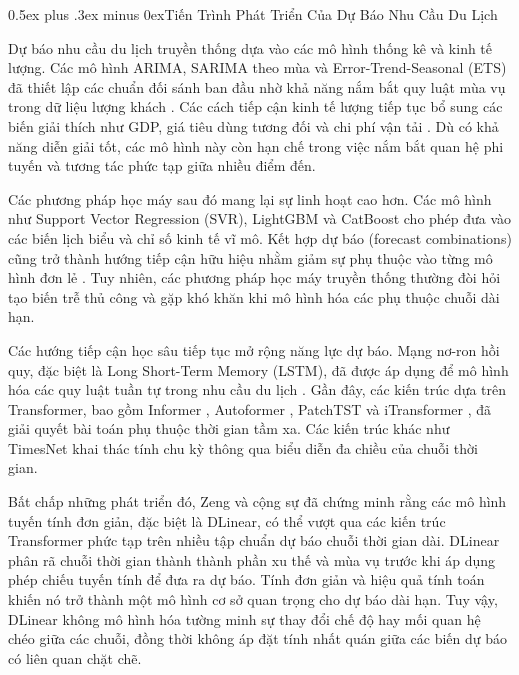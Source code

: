 \documentclass[10pt,journal,compsoc]{IEEEtran}
\makeatletter
\def\subsection{\@startsection{subsection}{2}{\z@}{-1.8ex plus -0.6ex minus -0.3ex}%
{0.5ex plus .3ex minus 0ex}{\normalfont\normalsize\rmfamily\bfseries}}
\makeatother
\begin{document}
\subsection{Tiến Trình Phát Triển Của Dự Báo Nhu Cầu Du Lịch}

Dự báo nhu cầu du lịch truyền thống dựa vào các mô hình thống kê và kinh tế lượng. Các mô hình ARIMA, SARIMA theo mùa và Error-Trend-Seasonal (ETS) đã thiết lập các chuẩn đối sánh ban đầu nhờ khả năng nắm bắt quy luật mùa vụ trong dữ liệu lượng khách \cite{athanasopoulos2011tourism}. Các cách tiếp cận kinh tế lượng tiếp tục bổ sung các biến giải thích như GDP, giá tiêu dùng tương đối và chi phí vận tải \cite{song2019tourism,clements1998forecasting}. Dù có khả năng diễn giải tốt, các mô hình này còn hạn chế trong việc nắm bắt quan hệ phi tuyến và tương tác phức tạp giữa nhiều điểm đến.

Các phương pháp học máy sau đó mang lại sự linh hoạt cao hơn. Các mô hình như Support Vector Regression (SVR), LightGBM \cite{ke2017lightgbm} và CatBoost \cite{dorogush2018catboost} cho phép đưa vào các biến lịch biểu và chỉ số kinh tế vĩ mô. Kết hợp dự báo (forecast combinations) cũng trở thành hướng tiếp cận hữu hiệu nhằm giảm sự phụ thuộc vào từng mô hình đơn lẻ \cite{claveria2016tourism}. Tuy nhiên, các phương pháp học máy truyền thống thường đòi hỏi tạo biến trễ thủ công và gặp khó khăn khi mô hình hóa các phụ thuộc chuỗi dài hạn.

Các hướng tiếp cận học sâu tiếp tục mở rộng năng lực dự báo. Mạng nơ-ron hồi quy, đặc biệt là Long Short-Term Memory (LSTM), đã được áp dụng để mô hình hóa các quy luật tuần tự trong nhu cầu du lịch \cite{hochreiter1997lstm,law2019tourism}. Gần đây, các kiến trúc dựa trên Transformer, bao gồm Informer \cite{zhou2021informer}, Autoformer \cite{wu2021autoformer}, PatchTST \cite{nie2023patchtst} và iTransformer \cite{liu2024itransformer}, đã giải quyết bài toán phụ thuộc thời gian tầm xa. Các kiến trúc khác như TimesNet \cite{wu2023timesnet} khai thác tính chu kỳ thông qua biểu diễn đa chiều của chuỗi thời gian.

Bất chấp những phát triển đó, Zeng và cộng sự \cite{zeng2023dlinear} đã chứng minh rằng các mô hình tuyến tính đơn giản, đặc biệt là DLinear, có thể vượt qua các kiến trúc Transformer phức tạp trên nhiều tập chuẩn dự báo chuỗi thời gian dài. DLinear phân rã chuỗi thời gian thành thành phần xu thế và mùa vụ trước khi áp dụng phép chiếu tuyến tính để đưa ra dự báo. Tính đơn giản và hiệu quả tính toán khiến nó trở thành một mô hình cơ sở quan trọng cho dự báo dài hạn. Tuy vậy, DLinear không mô hình hóa tường minh sự thay đổi chế độ hay mối quan hệ chéo giữa các chuỗi, đồng thời không áp đặt tính nhất quán giữa các biến dự báo có liên quan chặt chẽ.
\end{document}
